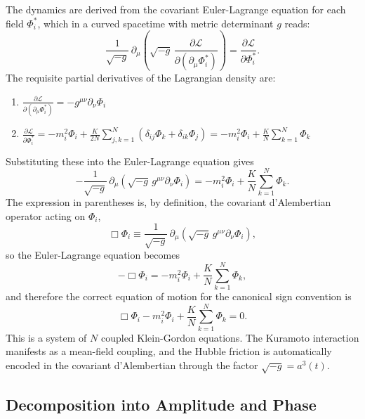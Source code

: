 The dynamics are derived from the covariant Euler-Lagrange equation for each field $\Phi_i^*$, which in a curved spacetime with metric determinant $g$ reads:
\begin{equation}
    \frac{1}{\sqrt{-g}}\,\partial_\mu\!\left(\sqrt{-g}\,\frac{\partial\mathcal{L}}{\partial(\partial_\mu\Phi_i^*)}\right)
    = \frac{\partial\mathcal{L}}{\partial\Phi_i^*} .
\end{equation}
The requisite partial derivatives of the Lagrangian density are:
\begin{enumerate}
    \item $\displaystyle \frac{\partial\mathcal{L}}{\partial(\partial_\mu\Phi_i^*)} = -g^{\mu\nu}\partial_\nu\Phi_i$
    \item $\displaystyle \frac{\partial\mathcal{L}}{\partial\Phi_i^*} = -m_i^2\Phi_i + \frac{K}{2N}\sum_{j,k=1}^N(\delta_{ij}\Phi_k + \delta_{ik}\Phi_j) = -m_i^2\Phi_i + \frac{K}{N}\sum_{k=1}^N\Phi_k$
\end{enumerate}
Substituting these into the Euler-Lagrange equation gives
\begin{equation}
    -\frac{1}{\sqrt{-g}}\,\partial_\mu\!\left(\sqrt{-g}\,g^{\mu\nu}\partial_\nu\Phi_i\right)
    = -m_i^2\Phi_i + \frac{K}{N}\sum_{k=1}^N\Phi_k .
\end{equation}
The expression in parentheses is, by definition, the covariant d'Alembertian operator acting on $\Phi_i$,
\begin{equation}
    \Box\Phi_i \equiv \frac{1}{\sqrt{-g}}\,\partial_\mu\!\left(\sqrt{-g}\,g^{\mu\nu}\partial_\nu\Phi_i\right) ,
\end{equation}
so the Euler-Lagrange equation becomes
\begin{equation}
    -\Box\Phi_i = -m_i^2\Phi_i + \frac{K}{N}\sum_{k=1}^N\Phi_k ,
\end{equation}
and therefore the correct equation of motion for the canonical sign convention is
\begin{equation}
    {
    \Box\Phi_i - m_i^2\Phi_i + \frac{K}{N}\sum_{k=1}^N\Phi_k = 0
    } .
\end{equation}
This is a system of $N$ coupled Klein-Gordon equations. The Kuramoto interaction manifests as a mean-field coupling, and the Hubble friction is automatically encoded in the covariant d'Alembertian through the factor $\sqrt{-g}=a^3(t)$.

\subsection{Decomposition into Amplitude and Phase}
\label{subsec:polar}


